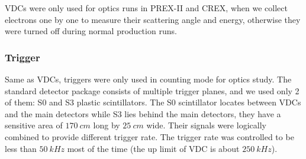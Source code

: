 VDCs were only used for optics runs in PREX-II and CREX, when we collect electrons
one by one to measure their scattering angle and energy, otherwise they were
turned off during normal production runs.


\subsubsection{Trigger}
Same as VDCs, triggers were only used in counting mode for optics study. The standard
detector package consists of multiple trigger planes, and we used only 2 of them:
S0 and S3 plastic scintillators. The S0 scintillator locates between VDCs and the main
detectors while S3 lies behind the main detectors, they have a sensitive area
of $170\ cm$ long by $25\ cm$ wide. Their signals were logically combined to 
provide different trigger rate. The trigger rate was controlled to be less
than $50\ kHz$ most of the time (the up limit of VDC is about $250\ kHz$).

